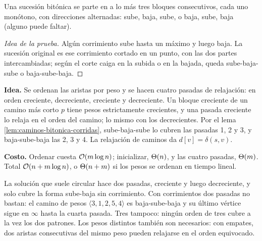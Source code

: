 \documentclass[11pt,letterpaper]{article}
\begin{document}
\begin{lema}\label{lem:caminos-bitonica-corridas}
  Una sucesión bitónica se parte en a lo más tres bloques
  consecutivos, cada uno monótono, con direcciones alternadas: sube,
  baja, sube, o baja, sube, baja (alguno puede faltar).
\end{lema}

\begin{proof}[Idea de la prueba]
  Algún corrimiento sube hasta un máximo y luego baja. La sucesión
  original es ese corrimiento cortado en un punto, con las dos partes
  intercambiadas; según el corte caiga en la subida o en la bajada,
  queda sube-baja-sube o baja-sube-baja.
\end{proof}

\textbf{Idea.} Se ordenan las aristas por peso y se hacen cuatro
pasadas de relajación: en orden creciente, decreciente, creciente y
decreciente. Un bloque creciente de un camino más corto $p$ tiene
pesos estrictamente crecientes, y una pasada creciente lo relaja en el
orden del camino; lo mismo con los decrecientes. Por el lema
\ref{lem:caminos-bitonica-corridas}, sube-baja-sube lo cubren las
pasadas 1, 2 y 3, y baja-sube-baja las 2, 3 y 4. La relajación de
caminos da $d[v] = \delta(s, v)$.

\textbf{Costo.} Ordenar cuesta $\mathcal{O}\!\left(m \log n\right)$; inicializar,
$\Theta\!\left(n\right)$, y las cuatro pasadas, $\Theta\!\left(m\right)$. Total
$\mathcal{O}\!\left(n + m \log n\right)$, o $\Theta\!\left(n + m\right)$ si los pesos se ordenan en
tiempo lineal.

\begin{ojo}
  La solución que suele circular hace dos pasadas, creciente y luego
  decreciente, y solo cubre la forma sube-baja sin corrimiento. Con
  corrimientos dos pasadas no bastan: el camino de pesos
  $\langle 3, 1, 2, 5, 4 \rangle$ es baja-sube-baja y su último vértice
  sigue en $\infty$ hasta la cuarta pasada. Tres tampoco: ningún orden
  de tres cubre a la vez los dos patrones. Los pesos distintos también
  son necesarios: con empates, dos aristas consecutivas del mismo peso
  pueden relajarse en el orden equivocado.
\end{ojo}

\newcommand{\paresCambio}[1]{\textcolor{acento}{\boldsymbol{#1}}}
\newcommand{\paresNulo}{\text{\scriptsize\textsc{nulo}}}
\end{document}
